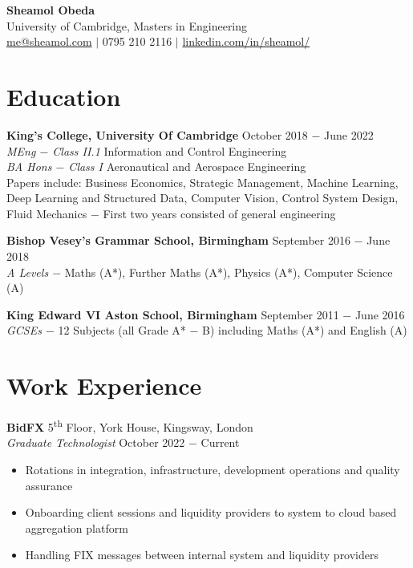\documentclass{article}
\begin{document}
\begin{center}

\LARGE \textbf{Sheamol Obeda\\}
\Large {\color{DarkSlateBlue} University of Cambridge, Masters in Engineering}\\
\normalsize \href{mailto: me@sheamol.com}{me@sheamol.com} $\mid$ 0795 210 2116 $\mid$ \href{https://www.linkedin.com/in/sheamol/}{linkedin.com/in/sheamol/}\\
\vspace{-.5\baselineskip}
\hrulefill
\vspace{-.5\baselineskip}
\end{center}

\section*{Education}

\textbf{King's College, University Of Cambridge}  \hfill October 2018 $-$ June 2022\\
\textit{MEng $-$ Class II.1} Information and Control Engineering\\
\textit{BA Hons $-$ Class I} Aeronautical and Aerospace Engineering \\
Papers include: Business Economics, Strategic Management, Machine Learning, Deep Learning and Structured Data, Computer Vision, Control System Design,  Fluid Mechanics $-$ First two years consisted of general engineering\medskip

\textbf{Bishop Vesey's Grammar School, Birmingham} \hfill September 2016 $-$ June 2018 \\
\textit{A Levels $-$} Maths (A*), Further Maths (A*), Physics (A*), Computer Science (A)\medskip

\textbf{King Edward VI Aston School, Birmingham} \hfill September 2011 $-$ June 2016 \\
\textit{GCSEs $-$} 12 Subjects (all Grade A* $-$  B) including Maths (A*) and English (A)

\vspace{-.5\baselineskip}
\hrulefill
\vspace{-.5\baselineskip}

\section*{Work Experience}

\textbf{BidFX} \hfill 5\textsuperscript{th} Floor, York House, Kingsway, London\\
\textit{Graduate Technologist} \hfill October 2022 $-$ Current
\begin{itemize}
    \item Rotations in integration, infrastructure, development operations and quality assurance
    \item Onboarding client sessions and liquidity providers to system to cloud based aggregation platform
    \item Handling FIX messages between internal system and liquidity providers
\end{itemize} \medskip
\end{document}
